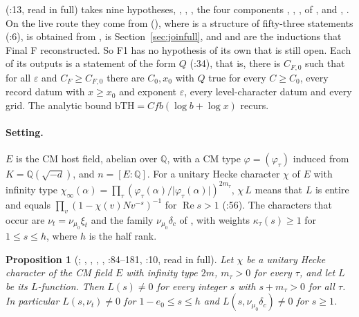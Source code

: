 \documentclass[11pt]{article}
\newtheorem{proposition}[theorem]{Proposition}
\theoremstyle{remark}
\begin{document}
 (:13, read in full) takes nine hypotheses, , , , the four components , , ,  of , and , . On the live route they come from  (), where  is a structure of fifty-three  statements (:6),  is obtained from ,  is Section~\ref{sec:joinfull}, and  and  are the inductions that Final F reconstructed. So F1 has no hypothesis of its own that is still open. Each of its outputs is a statement of the form  $Q$ (:34), that is, there is $C_{F,0}$ such that for all $\varepsilon$ and $C_F\ge C_{F,0}$ there are $C_0,x_0$ with $Q$ true for every $C\ge C_0$, every record datum with $x\ge x_0$ and exponent $\varepsilon$, every level-character datum and every grid. The analytic bound $\mathrm{bTH}=C f b(\log b+\log x)$ recurs.

\paragraph{Setting.} $E$ is the CM host field, abelian over $\mathbb Q$, with a CM type $\varphi=(\varphi_\tau)$ induced from $K=\mathbb Q(\sqrt{-d})$, and $n=[E:\mathbb Q]$. For a unitary Hecke character $\chi$ of $E$ with infinity type $\chi_\infty(\alpha)=\prod_\tau(\varphi_\tau(\alpha)/\lvert\varphi_\tau(\alpha)\rvert)^{2m_\tau}$,  $\chi\,L$ means that $L$ is entire and equals $\prod_v(1-\chi(v)Nv^{-s})^{-1}$ for $\operatorname{Re}s>1$ (:56). The characters that occur are $\nu_t=\nu_{\mu_0}\xi_t$ and the family $\nu_{\mu_0}\delta_c$ of , with weights $\kappa_\tau(s)\ge1$ for $1\le s\le h$, where $h$ is the half rank.

\begin{proposition}[; , , , , :84--181, :10, read in full]\label{prop:lne}
Let $\chi$ be a unitary Hecke character of the CM field $E$ with infinity type $2m$, $m_\tau>0$ for every $\tau$, and let $L$ be its $L$-function. Then $L(s)\ne0$ for every integer $s$ with $s+m_\tau>0$ for all $\tau$. In particular $L(s,\nu_t)\ne0$ for $1-e_0\le s\le h$ and $L(s,\nu_{\mu_0}\delta_c)\ne0$ for $s\ge1$.
\end{proposition}
\end{document}

